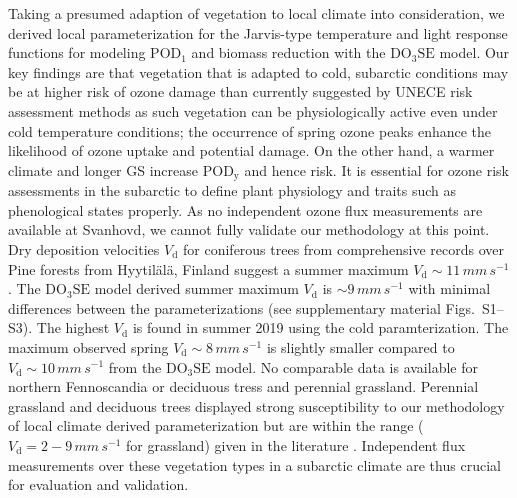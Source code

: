 \documentclass[bg, manuscript]{copernicus}
\begin{document}
Taking a presumed adaption of vegetation to local climate into consideration, we derived local parameterization for the Jarvis-type temperature and light response functions for modeling $\mathrm{POD_1}$ and biomass reduction with the $\mathrm{DO_3SE}$ model. Our key findings are that vegetation that is adapted to cold, subarctic conditions may be at higher risk of ozone damage than currently suggested by UNECE risk assessment methods as such vegetation can be physiologically active even under cold temperature conditions; the occurrence of spring ozone peaks enhance the likelihood of ozone uptake and potential damage. On the other hand, a warmer climate and longer GS increase $\mathrm{POD_y}$ and hence risk. It is essential for ozone risk assessments in the subarctic to define plant physiology and traits such as phenological states properly. As no independent ozone flux measurements are available at Svanhovd, we cannot fully validate our methodology at this point. 
Dry deposition velocities $V_\mathrm{d}$ for coniferous trees from comprehensive records over Pine forests from Hyytilälä, Finland \citep{BER:Keronen2003} suggest a summer maximum $V_\mathrm{d}\sim 11\,\unit{mm\,s^{-1}}$. The $\mathrm{DO_3SE}$ model derived summer maximum $V_\mathrm{d}$ is $\sim 9\,\unit{mm\,s^{-1}}$ with minimal differences between the parameterizations (see supplementary material Figs.~S1--S3). The highest $V_\mathrm{d}$ is found in summer 2019 using the cold paramterization. The maximum observed spring $V_\mathrm{d}\sim 8\,\unit{mm\,s^{-1}}$ is slightly smaller compared to $V_\mathrm{d}\sim 10\,\unit{mm\,s^{-1}}$ from the $\mathrm{DO_3SE}$ model. No comparable data is available for northern Fennoscandia or deciduous tress and perennial grassland. Perennial grassland and deciduous trees displayed strong susceptibility to our methodology of local climate derived parameterization but are within the range ($V_\mathrm{d} = 2-9\,\unit{mm\,s^{-1}}$ for grassland) given in the literature \citep[e.g.][]{JGR:Jacob1992,AE:Padro1996,RG:Clifton2020}. Independent flux measurements over these vegetation types in a subarctic climate are thus crucial for evaluation and validation. 
\end{document}
